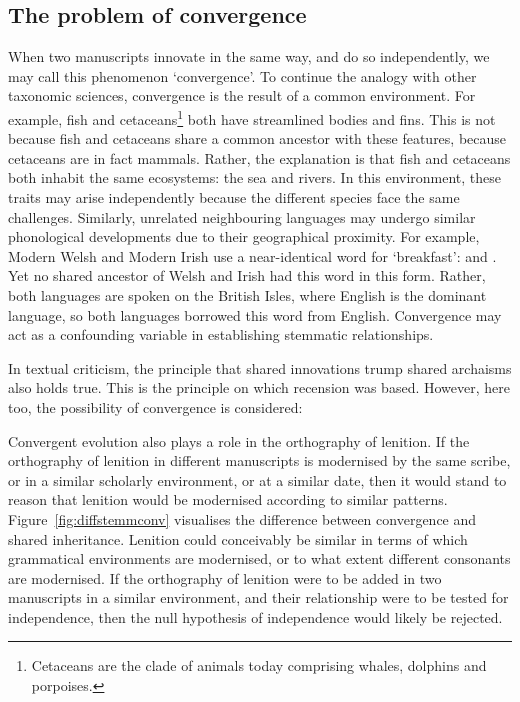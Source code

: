 \subsection{The problem of convergence}
\label{sec:problem-convergence}

When two manuscripts innovate in the same way, and do so independently, we may call this phenomenon `convergence'. To continue the analogy with other taxonomic sciences, convergence is the result of a common environment. For example, fish and cetaceans\footnote{Cetaceans are the clade of animals today comprising whales, dolphins and porpoises.} both have streamlined bodies and fins. This is not because fish and cetaceans share a common ancestor with these features, because cetaceans are in fact mammals. Rather, the explanation is that fish and cetaceans both inhabit the same ecosystems: the sea and rivers. In this environment, these traits may arise independently because the different species face the same challenges. Similarly, unrelated neighbouring languages may undergo similar phonological developments due to their geographical proximity. For example, Modern Welsh and Modern Irish use a near-identical word for `breakfast':  and . Yet no shared ancestor of Welsh and Irish had this word in this form. Rather, both languages are spoken on the British Isles, where English is the dominant language, so both languages borrowed this word from English. Convergence may act as a confounding variable in establishing stemmatic relationships.

In textual criticism, the principle that shared innovations trump shared archaisms also holds true. This is the principle on which recension was based. However, here too, the possibility of convergence is considered: 

Convergent evolution also plays a role in the orthography of lenition. If the orthography of lenition in different manuscripts is modernised by the same scribe, or in a similar scholarly environment, or at a similar date, then it would stand to reason that lenition would be modernised according to similar patterns. Figure~\ref{fig:diffstemmconv} visualises the difference between convergence and shared inheritance. Lenition could conceivably be similar in terms of which grammatical environments are modernised, or to what extent different consonants are modernised. If the orthography of lenition were to be added in two manuscripts in a similar environment, and their relationship were to be tested for independence, then the null hypothesis of independence would likely be rejected.

